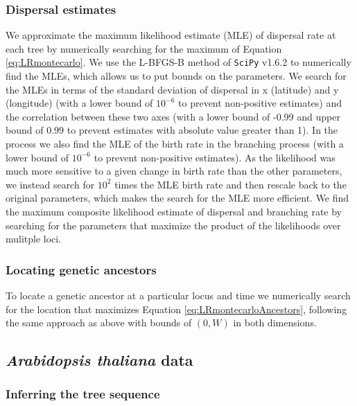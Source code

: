 \documentclass[12pt]{article}
\begin{document}
\subsubsection*{Dispersal estimates}

We approximate the maximum likelihood estimate (MLE) of dispersal rate at each tree by numerically searching for the maximum of Equation \eqref{eq:LRmontecarlo}.
We use the L-BFGS-B method of \texttt{SciPy} v1.6.2 \citep{2020SciPy-NMeth} to numerically find the MLEs, which allows us to put bounds on the parameters.
We search for the MLEs in terms of the standard deviation of dispersal in x (latitude) and y (longitude) (with a lower bound of $10^{-6}$ to prevent non-positive estimates) and the correlation between these two axes (with a lower bound of -0.99 and upper bound of 0.99 to prevent estimates with absolute value greater than 1). 
In the process we also find the MLE of the birth rate in the branching process (with a lower bound of $10^{-6}$ to prevent non-positive estimates).
As the likelihood was much more sensitive to a given change in birth rate than the other parameters, we instead search for $10^2$ times the MLE birth rate and then rescale back to the original parameters, which makes the search for the MLE more efficient.
We find the maximum composite likelihood estimate of dispersal and branching rate by searching for the parameters that maximize the product of the likelihoods over mulitple loci. 

\subsubsection*{Locating genetic ancestors}

To locate a genetic ancestor at a particular locus and time we numerically search for the location that maximizes Equation \eqref{eq:LRmontecarloAncestors}, following the same approach as above with bounds of $(0,W)$ in both dimensions.

\subsection*{\textit{Arabidopsis thaliana} data}

\subsubsection*{Inferring the tree sequence}
\end{document}
